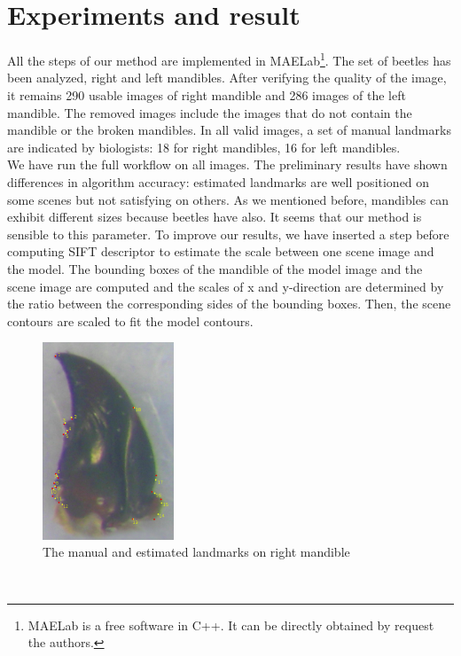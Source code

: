 \documentclass[twoside,twocolumn,10pt]{article}
\begin{document}
\section{Experiments and result}
All the steps of our method are implemented in MAELab\footnote{MAELab
  is a free software in C++. It can be directly obtained by request
  the authors.}. The set of beetles has been analyzed, right and left
mandibles. After verifying the quality of the image, it remains 290
usable images of right mandible and 286 images of the left mandible. The
removed images include the images that do not contain the mandible or
the broken mandibles. In all valid images, a set of manual landmarks are indicated by 
biologists: 18 for right mandibles, 16 for left mandibles.\\

We have run the full workflow on all images. The preliminary results have shown differences in algorithm accuracy: estimated landmarks are well positioned on some scenes but not satisfying on others. As we mentioned before, mandibles can exhibit different sizes because beetles have also. It seems that our method is sensible to this parameter. To improve our results, we have inserted a step before computing SIFT descriptor to estimate the scale between one scene image and the model. The bounding boxes of the mandible of the model image and the scene image are computed and the scales of x and y-direction are determined by the ratio between the corresponding sides of the bounding boxes. Then, the scene contours are scaled to fit the model contours. \\
\begin{figure}[h]
\centering
\includegraphics[width=0.35\textwidth]{./images/md_rs}
\caption{The manual and estimated landmarks on right mandible}
\label{figresult}
\end{figure}~\\
\end{document}
